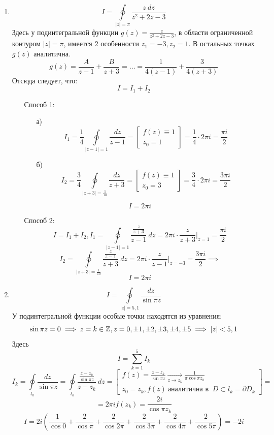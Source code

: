 \documentclass[../../main.tex]{subfiles}
\begin{document}
\begin{examples}
	\begin{enumerate}
		\item 
		\[ I = \oint \limits_{|z| = \pi} \frac{z \ dz}{z^2 + 2z - 3}  \]
		Здесь у подинтегральной функции $g(z) = \frac{z}{z^2 + 2z - 3}$, в области 
		ограниченной контуром $|z| = \pi$, имеется $2$ особенности $z_1 = -3, z_2 = 
		1$. В остальных точках $g(z)$ аналитична.
		\[  g(z) = \frac{A}{z-1} + \frac{B}{z+3} = \dots = \frac{1}{4(z-1)} + 
		\frac{3}{4(z+3)}  \]
		Отсюда следует, что:
		\[ I = I_1 + I_2  \]
		\begin{itemize}
			\item[Способ 1:]
			\begin{itemize}
				\item[а)]
				\[ I_1 = \frac{1}{4} \oint \limits_{|z-1| = 1} \frac{dz}{z-1} = \left[ 
				\begin{gathered} f(z) \equiv 1 \\
				z_0 = 1 
				\end{gathered} \right] = \frac{1}{4} \cdot 2 \pi i = \frac{\pi i }{2}    \]
				\item[б)]  
				\[ I_2 = \frac{3}{4} \oint \limits_{|z+3| = \frac{1}{10}} \frac{dz}{z+3} = 
				\left[ \begin{gathered} f(z) \equiv 1 \\
				z_0 = 3 
				\end{gathered} \right] = \frac{3}{4} \cdot 2 \pi i = \frac{3 \pi i }{2}    
				\]
			\end{itemize}
			\[ I = 2 \pi i \]
			\item[Способ 2:]
			\[  I = I_1 + I_2, I_1 = \oint \limits_{|z-1| = 1} 
			\frac{\frac{z}{z+3}}{z-1} \ dz = 2 \pi i \cdot \frac{z}{z+3} \bigg|_{z=1} = 
			\frac{\pi i}{2} \]
			\[ I_2 = \oint \limits_{|z+3| = \frac{1}{10}} \frac{\frac{z}{z-1}}{z+3} \ 
			dz = 2 \pi i \cdot \frac{z}{z-1} \bigg|_{z=-3} = \frac{3 \pi i}{2} \implies 
			 \]
			\[ I = 2 \pi i \]
		\end{itemize}
	\item \[ I = \oint \limits_{|z|=5,1} \frac{dz}{\sin{\pi z}} \]
	У подинтегральной функции особые точки находятся из уравнения:
	\[  \sin{\pi z} = 0 \implies z = k \in \mathbb{Z}, z = 0, \pm 1, \pm 2, \pm 3 , \pm 4 
	, \pm 5 \implies |z| < 5,1     \]
	Здесь 
	\[  I = \sum_{k=1}^{5} I_k       \]
	\[  I_k = \oint \limits_{l_k} \frac{dz}{\sin{\pi z}} = \oint \limits_{l_k} 
	\frac{\frac{z-z_k}{\sin{\pi z}}}{z-z_k} \ dz = \left[ \begin{gathered} f(z) = 
	\frac{z-z_k}{\sin{\pi z}} \underset{z \to z_k}{\rightarrow} \frac{1}{\pi 
	\cos{\pi z_k}} \\
	z_0 = z_k, f(z) \ \text{аналитична в } \ D \subset l_k = \partial D_k 
	\end{gathered} \right] =          \]
	\[  = 2 \pi i f(z_k) = \frac{2i}{\cos{\pi z_k}}       \]
	\[   I = 2i \left( \frac{1}{\cos{0}} + \frac{2}{\cos{\pi}} + \frac{2}{\cos{2 
	\pi}} + \frac{2}{\cos{3 \pi}}  + \frac{2}{\cos{4 \pi}} + \frac{2}{\cos{5 
	\pi}}\right) = -2i      \]
	\end{enumerate}
\end{examples}
\end{document}
